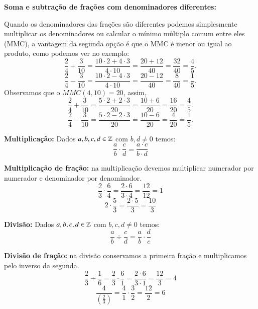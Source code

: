  \begin{exem}
 \textbf{Soma e subtração de frações com denominadores diferentes:}

   Quando os denominadores das frações são diferentes podemos simplesmente multiplicar os denominadores ou calcular o mínimo múltiplo comum entre eles (MMC), a vantagem da segunda opção é que o MMC é menor ou igual ao produto, como podemos ver no exemplo:
    \vskip0.3cm
   \[\frac{2}{4} + \frac{3}{10}= \frac{10 \cdot 2 + 4 \cdot 3}{4 \cdot 10}= \frac{20 + 12}{40}= \frac{32}{40}= \frac{4}{5} .\]
    \vskip0.3cm
   \[\frac{2}{4} - \frac{3}{10}= \frac{10 \cdot 2 - 4 \cdot 3}{4 \cdot 10}= \frac{20 - 12}{40}= \frac{8}{40}= \frac{1}{5} .\]
    \vskip0.3cm
   Observamos que o $MMC(4, 10)= 20$, assim,
    \vskip0.3cm
   \[\frac{2}{4} + \frac{3}{10}= \frac{5 \cdot 2 + 2 \cdot 3}{20}= \frac{10+6}{20}= \frac{16}{20}=\frac{4}{5} .\]
    \vskip0.3cm
   \[\frac{2}{4} - \frac{3}{10}= \frac{5 \cdot 2 - 2 \cdot 3}{20}= \frac{10 - 6}{20}= \frac{4}{20}=\frac{1}{5} .\]
 \end{exem}


 \vskip0.5cm

 \colorbox{azul}{
 \begin{minipage}{0.9\linewidth}
 \begin{center}
  \textbf{Multiplicação:} Dados $a, b, c, d \in \mathbb{Z}$ com $b, d \neq 0$ temos:
 \[\frac{a}{b} \cdot \frac{c}{d}= \frac{a \cdot c}{b \cdot d} \]
 \end{center}
 \end{minipage}}

 \vskip0.3cm
 \begin{exem}
  \textbf{Multiplicação de fração:} na multiplicação devemos multiplicar numerador por numerador e denominador por denominador.
   \[\frac{2}{3} \cdot \frac{6}{4}= \frac{2 \cdot 6}{3 \cdot 4}= \frac{12}{12}= 1 \]
   \[2 \cdot \frac{5}{3}= \frac{2 \cdot 5}{3}= \frac{10}{3}\]
 \end{exem}

 \vskip0.3cm

 \colorbox{azul}{
 \begin{minipage}{0.9\linewidth}
 \begin{center}
  \textbf{Divisão:} Dados $a, b, c, d \in \mathbb{Z}$ com $b, c, d \neq 0$ temos:
 \[\frac{a}{b} \div \frac{c}{d}= \frac{a}{b} \cdot \frac{d}{c} \]
 \end{center}
 \end{minipage}}

 \vskip0.3cm
 \begin{exem}
  \textbf{Divisão de fração:} na divisão conservamos a primeira fração e multiplicamos pelo inverso da segunda.
   \[\frac{2}{3} \div \frac{1}{6}= \frac{2}{3} \cdot \frac{6}{1}= \frac{2 \cdot 6}{3 \cdot 1}= \frac{12}{3}= 4 \]
   \[\frac{4}{\left(\frac{2}{3}\right)}= \frac{4}{1} \cdot \frac{3}{2}= \frac{12}{2}=6\]
 \end{exem}

